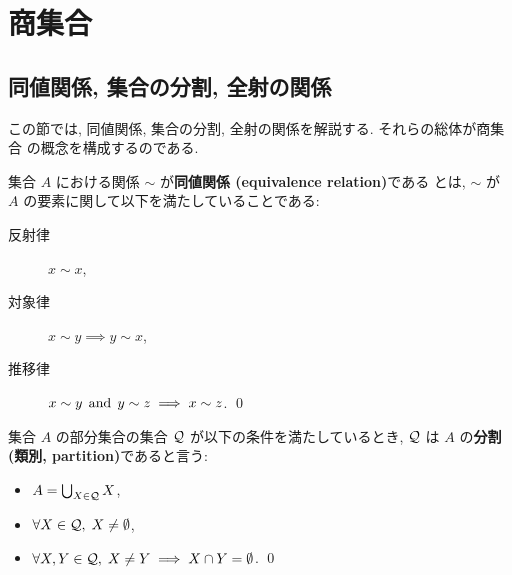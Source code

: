 \documentclass[12pt,twoside]{jarticle}
\def\AND{\mathop{\text{\rm and}}}
\begin{document}
%
%
%


\section{商集合}
\label{sec:quotient}

\subsection{同値関係, 集合の分割, 全射の関係}

この節では, 同値関係, 集合の分割, 全射の関係を解説する. それらの総体が商集合
の概念を構成するのである.

\begin{Definition}[同値関係]
  集合 $A$ における関係 $\sim$ が{\bf 同値関係 (equivalence relation)}である
  とは, $\sim$ が $A$ の要素に関して以下を満たしていることである:
  \begin{description}
  \item[反射律] $x\sim x$,
  \item[対象律] $x\sim y \implies y\sim x$,
  \item[推移律] $x\sim y \;\AND\; y\sim z \implies x\sim z$.
    \qed
  \end{description}
\end{Definition}

\begin{Definition}[分割]
  集合 $A$ の部分集合の集合 $\cal Q$ が以下の条件を満たしているとき, 
  $\cal Q$ は $A$ の{\bf 分割 (類別, partition)}であると言う:
  \begin{itemize}
  \item $A = \bigcup_{X\in{\cal Q}}X$,
  \item $\forall X\in{\cal Q},\; X\ne\emptyset$,
  \item $\forall X,Y\in{\cal Q},\; X\ne Y \implies X\cap Y = \emptyset$.
    \qed
  \end{itemize}
\end{Definition}
\end{document}
